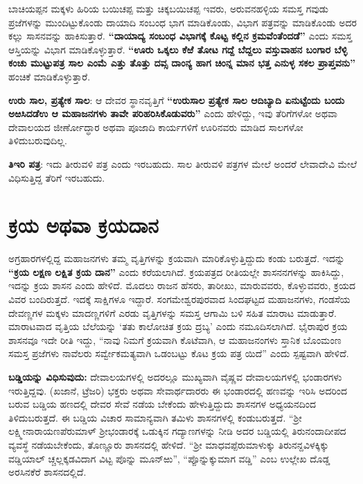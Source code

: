 ಬಾಚಿಯಪ್ಪನ ಮಕ್ಕಳು ಹಿರಿಯ ಬಯಿಚಪ್ಪ ಮತ್ತು ಚಿಕ್ಕಬಯಿಚಪ್ಪ ಇವರು, ಅರುವನಹಳ್ಳಿಯ ಸಮಸ್ತ ಗವುಡು ಪ್ರಜೆಗಳನ್ನು ಮುಂದಿಟ್ಟುಕೊಂಡು ದಾಯಾದಿ ಸಂಬಂಧ ಭಾಗ ಮಾಡಿಕೊಂಡು, ವಿಭಾಗ ಪತ್ರವನ್ನು ಮಾಡಿಕೊಂಡು ಅದರ ಕಲ್ಲು ಸಾಸನವನ್ನು ಹಾಕಿಸುತ್ತಾರೆ. \textbf{“ದಾಯಾದ್ಯ ಸಂಬಂಧ ವಿಭಾಗಕ್ಕೆ ಕೊಟ್ಟ ಕಲ್ಲಿನ ಕ್ರಮವೆಂತೆಂದಡೆ”} ಎಂದು ಸಮಸ್ತ ಆಸ್ತಿಯನ್ನು ವಿಭಾಗ ಮಾಡಿಕೊಳ್ಳುತ್ತಾರೆ. \textbf{“ಊರು ಒಕ್ಕಲು ಕೆಱೆ ತೋಟ ಗದ್ದೆ ಬೆದ್ದಲು ವಸ್ತುವಾಹನ ಬಂಗಾರ ಬೆಳ್ಳಿ ಕಂಚು ಮುಟ್ಟುಪತ್ರ ಸಾಲ ಎಂಮೆ ಎತ್ತು ತೊತ್ತು ದವ್ಸ ದಾಂನ್ಯ ಹಾಗ ಚಿಂನ್ನ ಮಾನ ಭತ್ತ ಎನುಳ್ಳ ಸಕಲ ಪ್ರಾಪ್ತವನು”} ಹಂಚಿಕೆ ಮಾಡಿಕೊಳ್ಳುತ್ತಾರೆ.

\textbf{ಉರು ಸಾಲ, ಪ್ರತ್ಯೇಕ ಸಾಲ}: ಆ ದೇವರ ಸ್ಥಾನವೃತ್ತಿಗೆ \textbf{“ಉರುಸಾಲ ಪ್ರತ್ಯೇಕ ಸಾಲ ಆದಿಬ್ಯಾದಿ ಏನುಟ್ಟೆಂದು ಬಂದು ಅಱಸಿದಡೆಉ ಆ ಮಹಾಜನಗಳು ತಾವೇ ಪರಿಹರಿಸಿಕೊಡುವರು” }ಎಂದು ಹೇಳಿದ್ದು, ಇವು ತೆರಿಗೆಗಳೋ ಅಥವಾ ದೇವಾಲಯದ ಜೀರ್ಣೋದ್ಧಾರ ಅಥವಾ ಪೂಜಾದಿ ಕಾರ್ಯಗಳಿಗೆ ಊರಿನವರು ಮಾಡಿದ ಸಾಲಗಳೋ ತಿಳಿದುಬರುವುದಿಲ್ಲ.

\textbf{ತಿಇರಿ ಪತ್ರ}: ಇದು ತೀರುವಳಿ ಪತ್ರ ಎಂದು ಇರಬಹುದು. ಸಾಲ ತೀರುವಳಿ ಪತ್ರಗಳ ಮೇಲೆ ಅಂದರೆ ಲೇವಾದೇವಿ ಮೇಲೆ ವಿಧಿಸುತ್ತಿದ್ದ ತೆರಿಗೆ ಇರಬಹುದು.

\section*{ಕ್ರಯ ಅಥವಾ ಕ್ರಯದಾನ}

ಅಗ್ರಹಾರಗಳಲ್ಲಿದ್ದ ಮಹಾಜನಗಳು ತಮ್ಮ ವೃತ್ತಿಗಳನ್ನು ಕ್ರಯವಾಗಿ ಮಾರಿಕೊಳ್ಳುತ್ತಿದ್ದುದು ಕಂಡು ಬರುತ್ತದೆ. ಇದನ್ನು\textbf{ “ಕ್ರಯ ಲಕ್ಷಣ ಲಕ್ಷಿತ ಕ್ರಯ ದಾನ” } ಎಂದು ಕರೆಯಲಾಗಿದೆ. ಕ್ರಯಪತ್ರದ ರೀತಿಯಲ್ಲೇ ಶಾಸನನಗಳನ್ನು ಹಾಕಿಸಿದ್ದು, ಇದನ್ನು ಕ್ರಯ ಶಾಸನ ಎಂದು ಹೇಳಿದೆ. ಮೊದಲು ರಾಜನ ಹೆಸರು, ತಾರೀಖು, ಮಾರುವವರು, ಕೊಳ್ಳುವವರು, ಕ್ರಯದ ವಿವರ ಬಂದಿರುತ್ತದೆ. ಇದಕ್ಕೆ ಸಾಕ್ಷಿಗಳೂ ಇದ್ದಾರೆ. ಸಂಗಮೇಶ್ವರಪುರವಾದ ಸಿಂದಘಟ್ಟದ ಮಹಾಜನಗಳು, ಗಂಡಸೆಯ ದೇವಣ್ಣಗಳ ಮಕ್ಕಳು ಮಾದಣ್ಣಗಳಿಗೆ ಎರಡು ವೃತ್ತಿಗಳನ್ನು ಸಮಸ್ತ ಆಗಾಮಿ ಬಳಿ ಸಹಿತ ಮಾರಾಟ ಮಾಡುತ್ತಾರೆ. ಮಾರಾಟವಾದ ವೃತ್ತಿಯ ಬೆಲೆಯನ್ನು ‘ತತು ಕಾಲೋಚಿತ ಕ್ರಯ ದ್ರಬ್ಯ’ ಎಂದು ನಮೂದಿಸಲಾಗಿದೆ. ಭೈರಾಪುರ ಕ್ರಯ ಶಾಸನವೂ ಇದೇ ರೀತಿ ಇದ್ದು, “ನಾವು ನಿಮಗೆ ಕ್ರಯವಾಗಿ ಕೊಟೆವಾಗಿ, ಆ ಮಹಾಜನಂಗಳು ಸ್ತಾನಿಕ ಬೊಂಮಂಣ ಸಮಸ್ತ ಪ್ರಜೆಗಳು ನಾವೆಲರು ಸರ್ವ್ವೇಕಮತ್ಯವಾಗಿ ಒಡಂಬಟ್ಟು ಕೊಟ ಕ್ರಯ ಪತ್ರ ಯಿದೆ” ಎಂದು ಸ್ಪಷ್ಟವಾಗಿ ಹೇಳಿದೆ.

\textbf{ಬಡ್ಡಿಯನ್ನು ವಿಧಿಸುವುದು:} ದೇವಾಲಯಗಳಲ್ಲಿ ಅದರಲ್ಲೂ ಮುಖ್ಯವಾಗಿ ವೈಷ್ಣವ ದೇವಾಲಯಗಳಲ್ಲಿ ಭಂಡಾರಗಳು ಇರುತ್ತಿದ್ದವು. (ಖಜಾನೆ, ಟ್ರೆಜರಿ) ಭಕ್ತರು ಅಥವಾ ಸೇವಾರ್ಥದಾರರು ಈ ಭಂಡಾರದಲ್ಲಿ ಹಣವನ್ನು ಇರಿಸಿ ಅದರಿಂದ ಬರುವ ಬಡ್ಡಿಯ ಹಣದಲ್ಲಿ ದೇವರ ಸೇವೆ ನಡೆಯ ಬೇಕೆಂದು ಹೇಳುತ್ತಿದ್ದುದು ಶಾಸನಗಳ ಅಧ್ಯಯನದಿಂದ ತಿಳಿದುಬರುತ್ತದೆ. ಈ ಬಡ್ಡಿಯ ವಿಚಾರ ಸಾಮಾನ್ಯವಾಗಿ ತಮಿಳು ಶಾಸನಗಳಲ್ಲಿ ಕಂಡುಬರುತ್ತದೆ. “ಶ‍್ರೀ ಲಕ್ಷ್ಮೀನಾರಾಯಣಪೆರುಮಾಳ್​ ಶ‍್ರೀಭಂಡಾರಕ್ಕೆ ಒಡುಕ್ಕಿನ ಗದ್ಯಾಣಗಳನ್ನು ನೀಡಿ ಅದರ ಬಡ್ಡಿಯಲ್ಲಿ ತಿರುನಂದಾದೀಪದ ವ್ಯವಸ್ಥೆ ನಡೆಯಬೇಕೆಂದು, ತೊಣ್ಣೂರು ಶಾಸನದಲ್ಲಿ ಹೇಳಿದೆ. “ಶ‍್ರೀ ಮಾಧವಪ್ಪೆರುಮಾಳುಕ್ಕು ತಿರುನನ್ದವಿಳಕ್ಕಿಕ್ಕು ವಡ್ಡಿಯಾಲ್​ ಚ್ಚಲ್ಲಕ್ಕಡವಿದಾಗ ವಿಟ್ಟ ಪೊನ್ನು ಮೂನ್​ಱು”, “ಪ್ಪೊನ್ನುಕ್ಕುಮಾಗ ವಡ್ಡಿ” ಎಂಬ ಉಲ್ಲೇಖ ದೊಡ್ಡ ಅರಸಿನಕೆರೆ ಶಾಸನದಲ್ಲಿದೆ.

